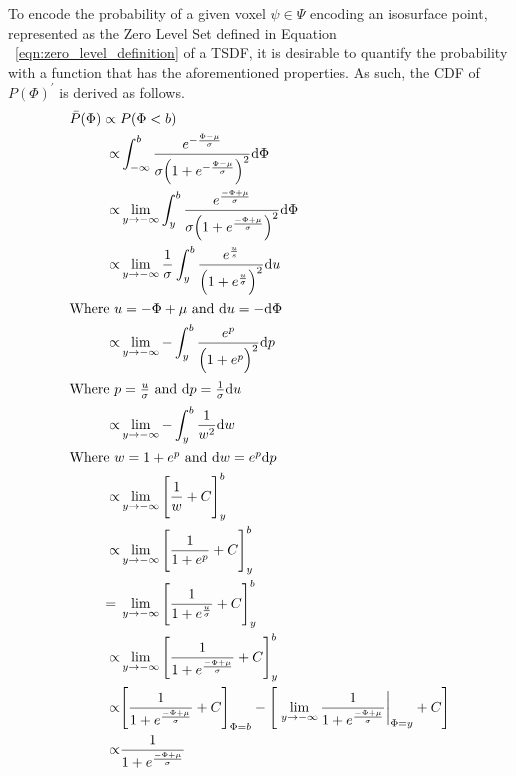 To encode the probability of a given voxel \(\psi \in \Psi\) encoding an
isosurface point, represented as the Zero Level Set defined in Equation
~\ref{eqn:zero_level_definition} of a TSDF, it is desirable to quantify the
probability with a function that has the aforementioned properties. As such, the
CDF of \(P{(\Phi)}^{\prime}\) is derived as follows.
\begin{align}
  \label{eqn:probobj_surface_prior_cdf}
  \bar{P}(\Phi) \propto{}& P(\Phi < b)\\
  \propto& \int_{-\infty}^{b} \frac
  {e^{-\frac{\Phi - \mu}{\sigma}}}
  {\sigma {\Big( 1 + e^{-\frac{\Phi - \mu}{\sigma}} \Big)}^{2}} {\mathrm d{\Phi}}\\
  \propto& \lim_{y\to -\infty} \int_{y}^{b} \frac
  {e^{\frac{-\Phi + \mu}{\sigma}}}
  {\sigma {\Big( 1 + e^{\frac{-\Phi + \mu}{\sigma}} \Big)}^{2}} {\mathrm d{\Phi}}\\
  \propto& \lim_{y\to -\infty} \frac{1}{\sigma} \int_{y}^{b}
  \frac{e^{\frac{u}{s}}}{{\Big( 1 + e^{\frac{u}{\sigma}} \Big)}^{2}} {\mathrm d{u}}\\
  \shortintertext{Where \( u = -\Phi + \mu \) and \({\mathrm d{u}} = -{\mathrm d{\Phi}}\)}
  \propto& \lim_{y\to -\infty} -\int_{y}^{b}
  \frac{e^{p}}{{\Big( 1 + e^{p} \Big)}^{2}} {\mathrm d{p}}\\
  \shortintertext{Where \(p = \frac{u}{\sigma}\) and \({\mathrm d{p}} = \frac{1}{\sigma} {\mathrm d{u}}\)}
  \propto& \lim_{y\to -\infty} -\int_{y}^{b} \frac{1}{w^{2}} {\mathrm d{w}}\\
  \shortintertext{Where \(w = 1 + e^{p}\) and \({\mathrm d{w}} = e^{p} {\mathrm d{p}}\)}
  \propto& \lim_{y\to -\infty} {\Bigg[ \frac{1}{w} + C \Bigg]}_{y}^{b}\\
  \propto& \lim_{y\to -\infty} {\Bigg[ \frac{1}{1 + e^{p}} + C \Bigg]}_{y}^{b}\\
  ={}& \lim_{y\to -\infty} {\Bigg[ \frac{1}{1 +e^{\frac{u}{\sigma}}} + C
  \Bigg]}_{y}^{b}\\
  \propto& \lim_{y\to -\infty} {\Bigg[ \frac{1}{1 + e^{\frac{-\Phi + \mu}{\sigma}}} +
  C \Bigg]}_{y}^{b}\\
  \propto& {\Bigg[ \frac{1}{1 + e^{\frac{-\Phi + \mu}{\sigma}}} + C \Bigg]}_{\Phi = b}
  - \Bigg[ \left. \lim_{y\to -\infty} \frac{1}{1 + e^{\frac{-\Phi + \mu}{\sigma}}}
  \right\rvert_{\Phi = y} + C \Bigg]\\
  \propto& \frac{1}{1 + e^{\frac{-\Phi + \mu}{\sigma}}}
\end{align}

